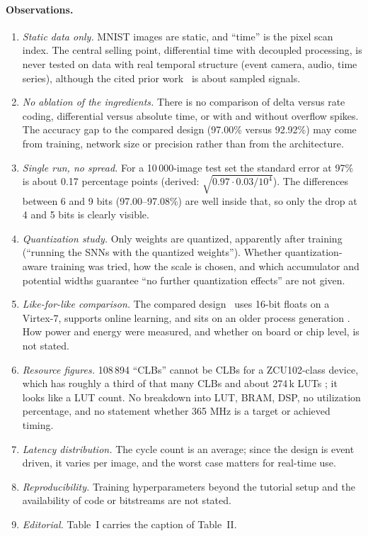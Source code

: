 \paragraph{Observations.}
\begin{enumerate}[leftmargin=1.5em]
\item \emph{Static data only.} MNIST images are static, and ``time'' is the pixel scan index. The central selling point, differential time with decoupled processing, is never tested on data with real temporal structure (event camera, audio, time series), although the cited prior work~\cite{moser2017,lunglmayr2021} is about sampled signals.
\item \emph{No ablation of the ingredients.} There is no comparison of delta versus rate coding, differential versus absolute time, or with and without overflow spikes. The accuracy gap to the compared design (97.00\% versus 92.92\%) may come from training, network size or precision rather than from the architecture.
\item \emph{Single run, no spread.} For a 10\,000-image test set the standard error at 97\% is about 0.17 percentage points (derived: $\sqrt{0.97\cdot0.03/10^4}$). The differences between 6 and 9 bits (97.00--97.08\%) are well inside that, so only the drop at 4 and 5 bits is clearly visible.
\item \emph{Quantization study.} Only weights are quantized, apparently after training (``running the SNNs with the quantized weights''). Whether quantization-aware training was tried, how the scale is chosen, and which accumulator and potential widths guarantee ``no further quantization effects'' are not given.
\item \emph{Like-for-like comparison.} The compared design~\cite{li2021fast} uses 16-bit floats on a Virtex-7, supports online learning, and sits on an older process generation . How power and energy were measured, and whether on board or chip level, is not stated.
\item \emph{Resource figures.} 108\,894 ``CLBs'' cannot be CLBs for a ZCU102-class device, which has roughly a third of that many CLBs and about 274\,k LUTs ; it looks like a LUT count. No breakdown into LUT, BRAM, DSP, no utilization percentage, and no statement whether 365 MHz is a target or achieved timing.
\item \emph{Latency distribution.} The cycle count is an average; since the design is event driven, it varies per image, and the worst case matters for real-time use.
\item \emph{Reproducibility.} Training hyperparameters beyond the tutorial setup and the availability of code or bitstreams are not stated.
\item \emph{Editorial.} Table~I carries the caption of Table~II.
\end{enumerate}

